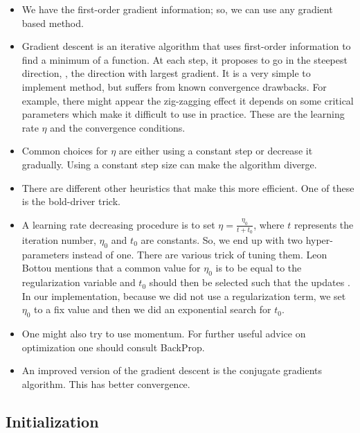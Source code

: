 \begin{itemize}
    \item We have the first-order gradient information; so, we
        can use any gradient based method.
    \item Gradient descent is an iterative algorithm that uses
        first-order information to find a minimum of a
        function. At each step, it proposes to go in the
        steepest direction, \ie, the direction with largest
        gradient. It is a very simple to implement method, but
        suffers from known convergence drawbacks. For example,
        there might appear the zig-zagging effect it depends
        on some critical parameters which make it difficult to
        use in practice. These are the learning rate $\eta$
        and the convergence conditions.
    \item Common choices for $\eta$ are either using a
        constant step or decrease it gradually. Using a
        constant step size can make the algorithm diverge.
    \item There are different other heuristics that make this
        more efficient. One of these is the bold-driver trick.
    \item A learning rate decreasing procedure is to set
        $\eta=\frac{\eta_0}{t + t_0}$, where $t$ represents
        the iteration number, $\eta_0$ and $t_0$ are
        constants. So, we end up with two hyper-parameters
        instead of one. There are various trick of tuning
        them. Leon Bottou mentions that a common value for
        $\eta_0$ is to be equal to the regularization variable
        and $t_0$ should then be selected such that the
        updates . In our implementation, because we did not
        use a regularization term, we set $\eta_0$ to a fix
        value and then we did an exponential search for $t_0$.
    \item One might also try to use momentum. For further
        useful advice on optimization one should consult
        BackProp.
    \item An improved version of the gradient descent is the
        conjugate gradients algorithm. This has better
        convergence.
\end{itemize}

\subsection{Initialization}
\label{subsec:initialization}

